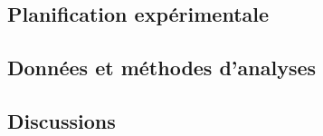 \subsection{Planification expérimentale}

\subsection{Données et méthodes d'analyses}

\subsection{Discussions}




